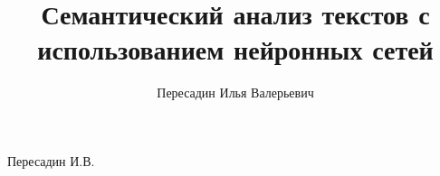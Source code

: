 \documentclass[]{itmo-student-thesis}
\begin{document}
\title{Семантический анализ текстов с использованием нейронных сетей}
\author{Пересадин Илья Валерьевич}{Пересадин И.В.}



\tableofcontents

%
%

%
%


\end{document}
